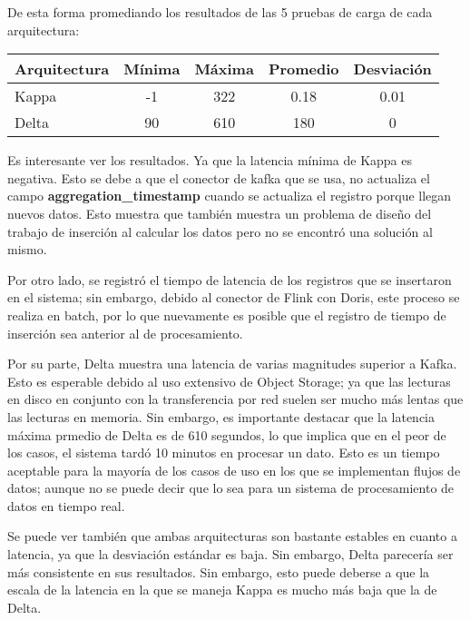 De esta forma promediando los resultados de las 5 pruebas de carga de cada arquitectura: 

\begin{longtable}{|p{3cm}|c|c|c|c|}
    \hline
    \textbf{Arquitectura} & \textbf{Mínima} & \textbf{Máxima} & \textbf{Promedio}  & \textbf{Desviación} \\
    \hline
    Kappa & -1 & 322 & 0.18 & 0.01\\
    \hline
    Delta & 90 & 610 & 180 & 0\\
    \hline
\end{longtable}

Es interesante ver los resultados. Ya que la latencia mínima de Kappa es negativa.  
Esto se debe a que el conector de kafka que se usa, no actualiza el campo \textbf{aggregation\_timestamp} cuando se actualiza el registro porque llegan nuevos datos.
Esto muestra que también muestra un problema de diseño del trabajo de inserción al calcular los datos pero no se encontró una solución al mismo. \newline

Por otro lado, se registró el tiempo de latencia de los registros que se insertaron en el sistema; sin embargo, debido al conector de Flink con Doris, 
este proceso se realiza en batch, por lo que nuevamente es posible que el registro de tiempo de inserción sea anterior al de procesamiento. 

\newpage

Por su parte, Delta muestra una latencia de varias magnitudes superior a Kafka. Esto es esperable debido al uso extensivo de Object Storage;
ya que las lecturas en disco en conjunto con la transferencia por red suelen ser mucho más lentas que las lecturas en memoria.
Sin embargo, es importante destacar que la latencia máxima prmedio de Delta es de 610 segundos, lo que implica que en el peor de los casos,
el sistema tardó 10 minutos en procesar un dato.
Esto es un tiempo aceptable para la mayoría de los casos de uso en los que se implementan flujos de datos; 
aunque no se puede decir que lo sea para un sistema de procesamiento de datos en tiempo real. \newline

Se puede ver también que ambas arquitecturas son bastante estables en cuanto a latencia, ya que la desviación estándar es baja.
Sin embargo, Delta parecería ser más consistente en sus resultados. 
Sin embargo, esto puede deberse a que la escala de la latencia en la que se maneja Kappa es mucho más baja que la de Delta. \newline

